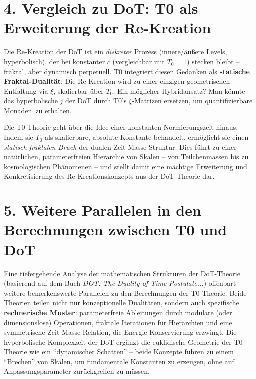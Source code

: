 	\section*{4. Vergleich zu DoT: T0 als Erweiterung der Re-Kreation}
	Die Re-Kreation der DoT ist ein \emph{diskreter} Prozess (innere/äußere Levels, hyperbolisch), der bei konstanter \( c \) (vergleichbar mit \( T_0 = 1 \)) stecken bleibt – fraktal, aber dynamisch perpetuell. T0 integriert diesen Gedanken als \textbf{statische Fraktal-Dualität}: Die Re-Kreation wird zu einer einzigen geometrischen Entfaltung via \( \xi \), skalierbar über \( T_0 \). Ein möglicher Hybridansatz? Man könnte das hyperbolische \( j \) der DoT durch T0's \( \xi \)-Matrizen ersetzen, um quantifizierbare \glqq Monaden\grqq\ zu erhalten.
	
	\begin{keyresultbox}
		Die T0-Theorie geht über die Idee einer konstanten Normierungszeit hinaus. Indem sie \( T_0 \) als skalierbare, absolute Konstante behandelt, ermöglicht sie einen \emph{statisch-fraktalen Bruch} der dualen Zeit-Masse-Struktur. Dies führt zu einer natürlichen, parameterfreien Hierarchie von Skalen – von Teilchenmassen bis zu kosmologischen Phänomenen – und stellt damit eine mächtige Erweiterung und Konkretisierung des Re-Kreationskonzepts aus der DoT-Theorie dar.
	\end{keyresultbox}
	
	
	\section*{5. Weitere Parallelen in den Berechnungen zwischen T0 und DoT}
	
	Eine tiefergehende Analyse der mathematischen Strukturen der DoT-Theorie (basierend auf dem Buch \emph{DOT: The Duality of Time Postulate...}) offenbart weitere bemerkenswerte Parallelen zu den Berechnungen der T0-Theorie. Beide Theorien teilen nicht nur konzeptionelle Dualitäten, sondern auch spezifische \textbf{rechnerische Muster}: parameterfreie Ableitungen durch modulare (oder dimensionslose) Operationen, fraktale Iterationen für Hierarchien und eine symmetrische Zeit-Masse-Relation, die Energie-Konservierung erzwingt. Die hyperbolische Komplexzeit der DoT ergänzt die euklidische Geometrie der T0-Theorie wie ein ``dynamischer Schatten'' – beide Konzepte führen zu einem ``Brechen'' von Skalen, um fundamentale Konstanten zu erzeugen, ohne auf Anpassungsparameter zurückgreifen zu müssen.
	
